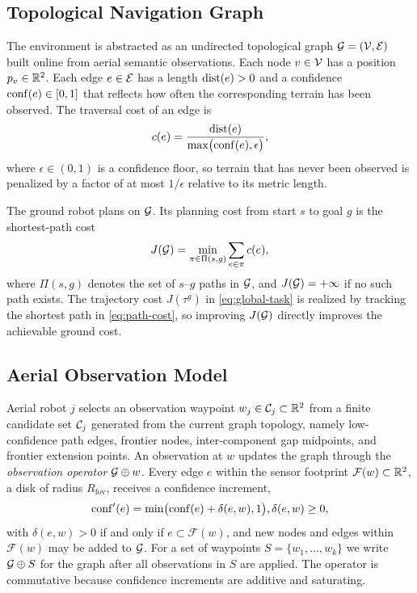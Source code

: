 \subsection{Topological Navigation Graph}
\label{sec:topo-graph}

The environment is abstracted as an undirected topological graph $\mathcal{G} = (\mathcal{V}, \mathcal{E})$ built online from aerial semantic observations. Each node $v \in \mathcal{V}$ has a position $p_v \in \mathbb{R}^2$. Each edge $e \in \mathcal{E}$ has a length $\mathrm{dist}(e) > 0$ and a confidence $\mathrm{conf}(e) \in [0, 1]$ that reflects how often the corresponding terrain has been observed. The traversal cost of an edge is
\begin{equation} c(e) = \frac{\mathrm{dist}(e)}{\max\bigl(\mathrm{conf}(e), \epsilon\bigr)}, \label{eq:edge-cost} \end{equation}
where $\epsilon \in (0, 1)$ is a confidence floor, so terrain that has never been observed is penalized by a factor of at most $1/\epsilon$ relative to its metric length.

The ground robot plans on $\mathcal{G}$. Its planning cost from start $s$ to goal $g$ is the shortest-path cost
\begin{equation} J(\mathcal{G}) = \min_{\pi \in \Pi(s, g)} \sum_{e \in \pi} c(e), \label{eq:path-cost} \end{equation}
where $\Pi(s,g)$ denotes the set of $s$--$g$ paths in $\mathcal{G}$, and $J(\mathcal{G}) = +\infty$ if no such path exists. The trajectory cost $J(\tau^{g})$ in \eqref{eq:global-task} is realized by tracking the shortest path in \eqref{eq:path-cost}, so improving $J(\mathcal{G})$ directly improves the achievable ground cost.

\subsection{Aerial Observation Model}

Aerial robot $j$ selects an observation waypoint $w_j \in \mathcal{C}_j \subset \mathbb{R}^2$ from a finite candidate set $\mathcal{C}_j$ generated from the current graph topology, namely low-confidence path edges, frontier nodes, inter-component gap midpoints, and frontier extension points. An observation at $w$ updates the graph through the \emph{observation operator} $\mathcal{G} \oplus w$. Every edge $e$ within the sensor footprint $\mathcal{F}(w) \subset \mathbb{R}^2$, a disk of radius $R_{\mathrm{fov}}$, receives a confidence increment,
\begin{equation} \mathrm{conf}'(e) = \min\bigl(\mathrm{conf}(e) + \delta(e, w), 1\bigr), \delta(e, w) \geq 0, \label{eq:obs-model} \end{equation}
with $\delta(e, w) > 0$ if and only if $e \subset \mathcal{F}(w)$, and new nodes and edges within $\mathcal{F}(w)$ may be added to $\mathcal{G}$. For a set of waypoints $S = \{w_1, \dots, w_k\}$ we write $\mathcal{G} \oplus S$ for the graph after all observations in $S$ are applied. The operator is commutative because confidence increments are additive and saturating.

